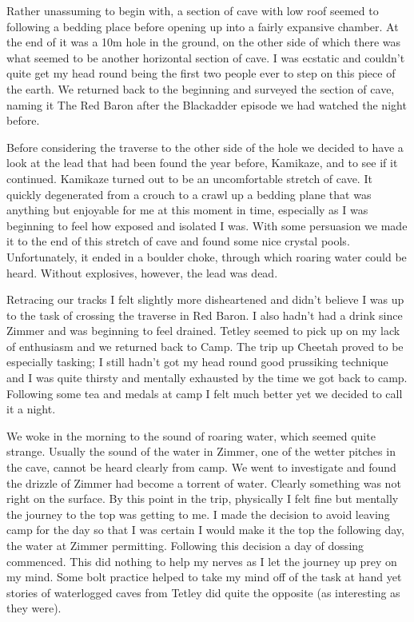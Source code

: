 Rather unassuming to begin with, a section of cave with low roof seemed
to following a bedding place before opening up into a fairly expansive
chamber. At the end of it was a 10m hole in the ground, on the other
side of which there was what seemed to be another horizontal section of
cave. I was ecstatic and couldn't quite get my head round being the
first two people ever to step on this piece of the earth. We returned
back to the beginning and surveyed the section of cave, naming it The
Red Baron after the Blackadder episode we had watched the night before.

Before considering the traverse to the other side of the hole we decided
to have a look at the lead that had been found the year before,
Kamikaze, and to see if it continued. Kamikaze turned out to be an
uncomfortable stretch of cave. It quickly degenerated from a crouch to a
crawl up a bedding plane that was anything but enjoyable for me at this
moment in time, especially as I was beginning to feel how exposed and
isolated I was. With some persuasion we made it to the end of this
stretch of cave and found some nice crystal pools. Unfortunately, it
ended in a boulder choke, through which roaring water could be heard.
Without explosives, however, the lead was dead.

Retracing our tracks I felt slightly more disheartened and didn't
believe I was up to the task of crossing the traverse in Red Baron. I
also hadn't had a drink since Zimmer and was beginning to feel drained.
Tetley seemed to pick up on my lack of enthusiasm and we returned back
to Camp. The trip up Cheetah proved to be especially tasking; I still
hadn't got my head round good prussiking technique and I was quite
thirsty and mentally exhausted by the time we got back to camp.
Following some tea and medals at camp I felt much better yet we decided
to call it a night.

We woke in the morning to the sound of roaring water, which seemed quite
strange. Usually the sound of the water in Zimmer, one of the wetter
pitches in the cave, cannot be heard clearly from camp. We went to
investigate and found the drizzle of Zimmer had become a torrent of
water. Clearly something was not right on the surface. By this point in
the trip, physically I felt fine but mentally the journey to the top was
getting to me. I made the decision to avoid leaving camp for the day so
that I was certain I would make it the top the following day, the water
at Zimmer permitting. Following this decision a day of dossing
commenced. This did nothing to help my nerves as I let the journey up
prey on my mind. Some bolt practice helped to take my mind off of the
task at hand yet stories of waterlogged caves from Tetley did quite the
opposite (as interesting as they were).

